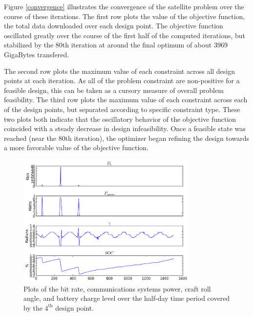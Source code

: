 \documentclass[]{aiaa-tc} %
\begin{document}
        Figure \ref{convergence} illustrates the convergence of the satellite problem over the course of
        these iterations. The first row plots the
        value of the objective function, the total data downloaded over each design point. The objective
        function oscillated greatly over the course of the first half of the computed iterations, but
        stabilized by the 80th iteration at around the final optimum of about 3969 GigaBytes transfered.

        The second row plots the maximum value of each constraint across all design points at
        each iteration. As all of the problem constraint are non-positive for a feasible design,
        this can be taken as a cursory measure of overall problem feasibility.
        The third row plots the maximum value of each constraint across each of the design points,
        but separated according to specific constraint type. These two plots both indicate that the
        oscillatory behavior of the objective function coincided with a steady decrease in design
        infeasibility. Once a feasible state was reached (near the 80th iteration), the optimizer
        began refining the design towards a more favorable value of the objective function.

        \begin{figure}[!htb]
        \centering
        \includegraphics[width=0.8\textwidth]{images/pt_3_data}
        \caption[width=0.4\textwidth]{Plots of the bit rate, communications systems power, craft roll angle,
        and battery charge level over the half-day time period covered by the $4^{\textrm{th}}$ design point.
        \label{pt3_data_results}
        }
        \end{figure}
\end{document}
